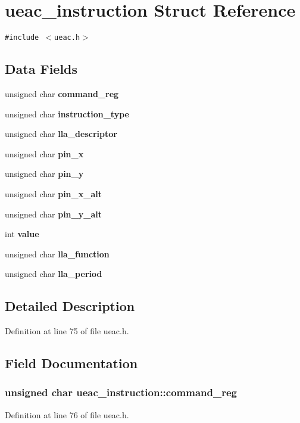 \section{ueac\_\-instruction Struct Reference}
\label{structueac__instruction}
{\tt \#include $<$ueac.h$>$}

\subsection*{Data Fields}
\begin{CompactItemize}
\item 
unsigned char {\bf command\_\-reg}
\item 
unsigned char {\bf instruction\_\-type}
\item 
unsigned char {\bf lla\_\-descriptor}
\item 
unsigned char {\bf pin\_\-x}
\item 
unsigned char {\bf pin\_\-y}
\item 
unsigned char {\bf pin\_\-x\_\-alt}
\item 
unsigned char {\bf pin\_\-y\_\-alt}
\item 
int {\bf value}
\item 
unsigned char {\bf lla\_\-function}
\item 
unsigned char {\bf lla\_\-period}
\end{CompactItemize}


\subsection{Detailed Description}




Definition at line 75 of file ueac.h.

\subsection{Field Documentation}
\subsubsection{\setlength{\rightskip}{0pt plus 5cm}unsigned char {\bf ueac\_\-instruction::command\_\-reg}}\label{structueac__instruction_o0}




Definition at line 76 of file ueac.h.

